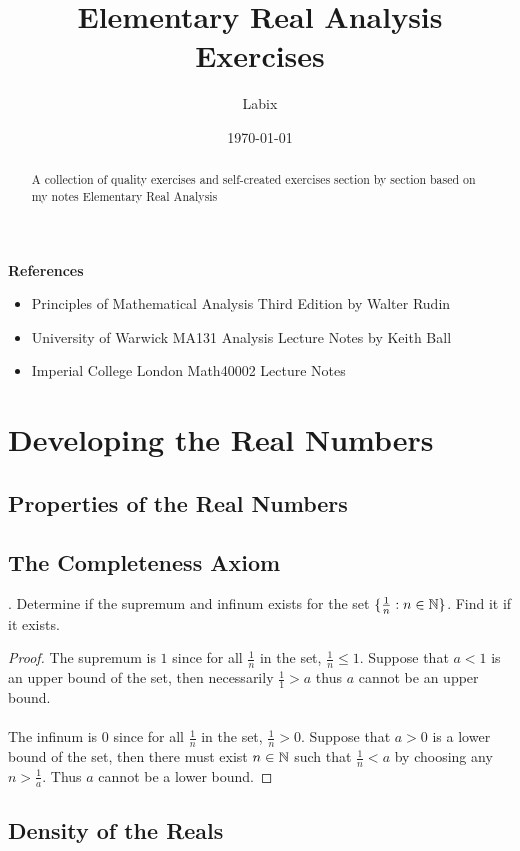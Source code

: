 \documentclass[a4paper]{article}
\title{Elementary Real Analysis Exercises}
\author{Labix}
\date{\today}
\begin{document}
\maketitle
\begin{abstract}
A collection of quality exercises and self-created exercises section by section based on my notes Elementary Real Analysis
\end{abstract}
\textbf{References}
\begin{itemize}
\item Principles of Mathematical Analysis Third Edition by Walter Rudin
\item University of Warwick MA131 Analysis Lecture Notes by Keith Ball
\item Imperial College London Math40002 Lecture Notes
\end{itemize}
\pagebreak
\tableofcontents
\pagebreak

\section{Developing the Real Numbers}
\subsection{Properties of the Real Numbers}


\subsection{The Completeness Axiom}
\begin{qtn}{}{}
\thetcbcounter.\;\; Determine if the supremum and infinum exists for the set $\{\frac{1}{n}:n\in\mathbb{N}\}$. Find it if it exists. \tcbline
\begin{proof}
The supremum is $1$ since for all $\frac{1}{n}$ in the set, $\frac{1}{n}\leq 1$. Suppose that $a<1$ is an upper bound of the set, then necessarily $\frac{1}{1}>a$ thus $a$ cannot be an upper bound. \\~\\
The infinum is $0$ since for all $\frac{1}{n}$ in the set, $\frac{1}{n}>0$. Suppose that $a>0$ is a lower bound of the set, then there must exist $n\in\mathbb{N}$ such that $\frac{1}{n}<a$ by choosing any $n>\frac{1}{a}$. Thus $a$ cannot be a lower bound. 
\end{proof}
\end{qtn}

\subsection{Density of the Reals}
\end{document}
